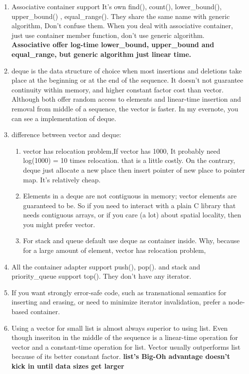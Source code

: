 \documentclass[a4paper,12pt,twoside]{book}
\begin{document}
\begin{itemize}
\begin{enumerate}
\item Associative container support It's own find(), count(),  lower\_bound(), upper\_bound() , equal\_range(). They share the same name with generic algorithm, Don't confuse them. When you deal with associative container, just use container member function, don't use generic algorithm. \textbf{Associative offer log-time lower\_bound, upper\_bound and equal\_range, but generic algorithm just linear time.}


\item deque is the data structure of choice when most insertions and deletions take place at the beginning or at the end of the sequence. It doesn't not guarantee continuity within memory, and higher constant factor cost than vector. Although both offer random access to elements and linear-time insertion and removal from middle of a sequence, the vector is faster.  In my evernote, you can see a implementation of deque.

\item difference between vector and deque:
\begin{enumerate}
\item vector has relocation problem,If vector has 1000, It probably need log(1000) = 10 times relocation. that is a little costly. On the contrary, deque just allocate a new place then insert pointer of new place to pointer map. It's relatively cheap.


\item Elements in a deque are not contiguous in memory; vector elements are guaranteed to be. So if you need to interact with a plain C library that needs contiguous arrays, or if you care (a lot) about spatial locality, then you might prefer vector.

\item For stack and queue default use deque as container inside. Why, because for a large amount of element, vector has relocation problem,
\end{enumerate}


\item All the container adapter support push(), pop(). and stack and priority\_queue support top(). They don't have any iterator.

\item If you want strongly error-safe code, such as transnational semantics for inserting and erasing, or need to minimize iterator invalidation, prefer a node-based container.

\item Using a vector for small list is almost always superior to using list. Even though inseriton in the middle of the sequence is a linear-time operation for vector and a constant-time operation for list. Vector usually outperforms list because of its better constant factor. \textbf{list's Big-Oh advantage doesn't kick in until data sizes get larger}


\end{enumerate}
\end{itemize}
\end{document}
